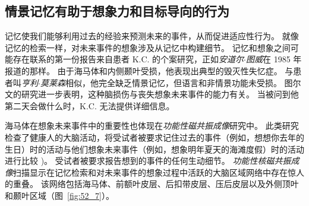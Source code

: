 \subsection{情景记忆有助于想象力和目标导向的行为}

记忆使我们能够利用过去的经验来预测未来的事件，从而促进适应性行为。
就像记忆的检索一样，对未来事件的想象涉及从记忆中构建细节。
记忆和想象之间可能存在联系的第一份报告来自患者 K.C. 的个案研究，正如\textit{安道尔$\cdot$图威}在 1985 年报道的那样。
由于海马体和内侧颞叶受损，他表现出典型的毁灭性失忆症。
与患者叫\textit{亨利$\cdot$莫莱森}相似，他完全缺乏情景记忆，但语言和非情景功能未受损。
图尔文的研究进一步表明，这种脑损伤与丧失想象未来事件的能力有关。
当被问到他第二天会做什么时，K.C. 无法提供详细信息。


海马体在想象未来事件中的重要性也体现在\textit{功能性磁共振成像}研究中。
此类研究检查了健康人的大脑活动，将受试者被要求记住过去的事件（例如，想想你去年的生日）时的活动与他们想象未来事件（例如，想象明年夏天的海滩度假）时的活动进行比较 )。
受试者被要求报告想到的事件的任何生动细节。
\textit{功能性核磁共振成像}扫描显示在记忆检索和对未来事件的想象过程中活跃的大脑区域网络中存在惊人的重叠。
该网络包括海马体、前额叶皮层、后扣带皮层、压后皮层以及外侧顶叶和颞叶区域（图~\ref{fig:52_7}）。


